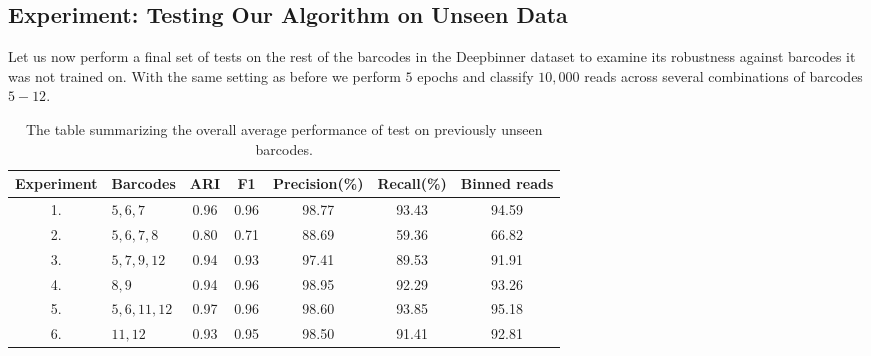 \subsection{Experiment: Testing Our Algorithm on Unseen Data}
Let us now perform a final set of tests on the rest of the barcodes in the Deepbinner dataset to examine its robustness against barcodes it was not trained on. With the same setting as before we perform $5$ epochs and classify $10,000$ reads across several combinations of barcodes $5-12$.

\begin{table}[!ht]
\centering
\begin{tabular}{|c|l|ccccc|}
\hline
Experiment & Barcodes & ARI &  F1 & Precision(\%) & Recall(\%) & Binned reads\\
\hline
1. & $5,6,7$ & 0.96 & 0.96 & 98.77 & 93.43 & 94.59\\
2. & $5,6,7,8$ & 0.80 & 0.71 & 88.69 & 59.36 & 66.82\\
3. & $5,7,9,12$ & 0.94 & 0.93 & 97.41 & 89.53 & 91.91\\
4. & $8,9$ & 0.94 & 0.96 & 98.95 & 92.29 & 93.26\\
5. & $5,6,11,12$ & 0.97 & 0.96 & 98.60 & 93.85 & 95.18\\
6. & $11, 12$ & 0.93 & 0.95 & 98.50 & 91.41 & 92.81\\
\hline
\end{tabular}
\caption{The table summarizing the overall average performance of test on previously unseen barcodes.}
\label{tab:final_tests_all}
\end{table}

